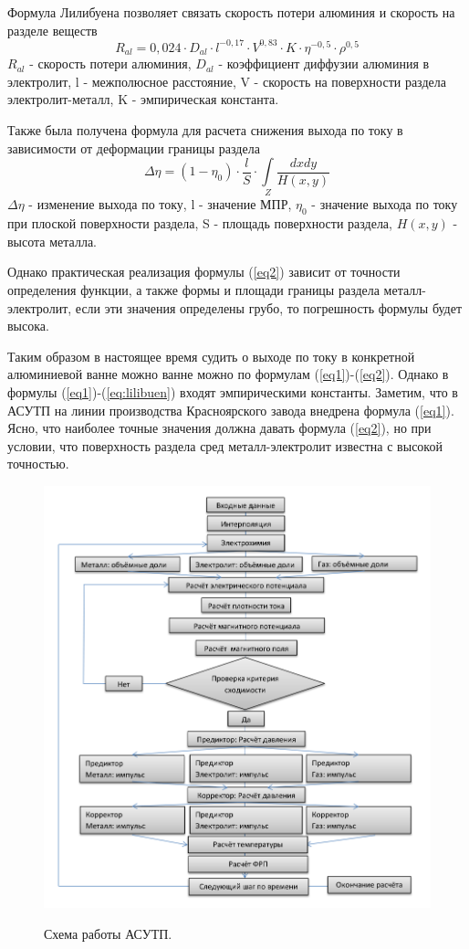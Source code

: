 \documentclass{article}
\begin{document}
Формула Лилибуена \cite{litlink:Lillebuen} позволяет связать скорость потери алюминия и скорость на разделе веществ
\begin{equation}\label{eq:lilibuen}
R_{al} = 0,024 \cdot D_{al} \cdot l^{-0,17} \cdot V^{0,83} \cdot K \cdot \eta^{-0,5} \cdot \rho^{0,5}
\end{equation}
$R_{al}$ - скорость потери алюминия, $D_{al}$ - коэффициент диффузии алюминия в электролит, l - межполюсное расстояние, V - скорость на поверхности раздела электролит-металл, K - эмпирическая константа.

Также была получена формула для расчета снижения выхода по току в зависимости от деформации границы раздела \cite{litlink:derkach2}
\begin{equation} \label{eq2}
\Delta \eta = (1- \eta_0) \cdot \frac{l}{S} \cdot \int\limits_Z \frac{dxdy}{H(x,y)}
\end{equation}
$\Delta \eta$ - изменение выхода по току, l - значение МПР, $\eta_0$ - значение выхода по току при плоской поверхности раздела, S - площадь  поверхности раздела, $H(x,y)$ - высота металла.

Однако практическая реализация формулы (\ref{eq2}) зависит от точности определения функции, а также формы и площади границы раздела металл-электролит, если эти значения определены грубо, то погрешность формулы будет высока.

Таким образом в настоящее время судить о выходе по току в конкретной алюминиевой ванне можно ванне можно по формулам (\ref{eq1})-(\ref{eq2}). Однако в формулы (\ref{eq1})-(\ref{eq:lilibuen}) входят эмпирическими константы. Заметим, что в АСУТП на линии производства Красноярского завода внедрена формула (\ref{eq1}). Ясно, что наиболее точные значения должна давать формула (\ref{eq2}), но при условии, что поверхность раздела сред металл-электролит известна с высокой точностью.

\begin{figure}[H]
\centering
\includegraphics[width=0.8\linewidth]{scheme.png}
\caption[]{}
\label{fig:ASUTPscheme}
Схема работы АСУТП.
\end{figure}
\end{document}
